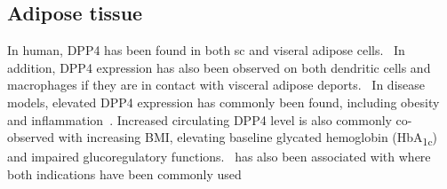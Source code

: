 \subsection{Adipose tissue}
In human, DPP4 has been found in both sc and viseral adipose cells.~\cite{Lamers2011} In addition, DPP4 expression has also been observed on both dendritic cells and macrophages if they are in contact with visceral adipose deports.~\cite{Zhong2013} In disease models, elevated DPP4 expression has commonly been found, including obesity and inflammation~\cite{Zhong2013}. Increased circulating DPP4 level is also commonly co-observed with increasing BMI, elevating baseline glycated hemoglobin (HbA\textsubscript{1c})~\cite{2011}  and impaired glucoregulatory functions.~\cite{Sell2013}  has also been associated with where both indications have been commonly used 